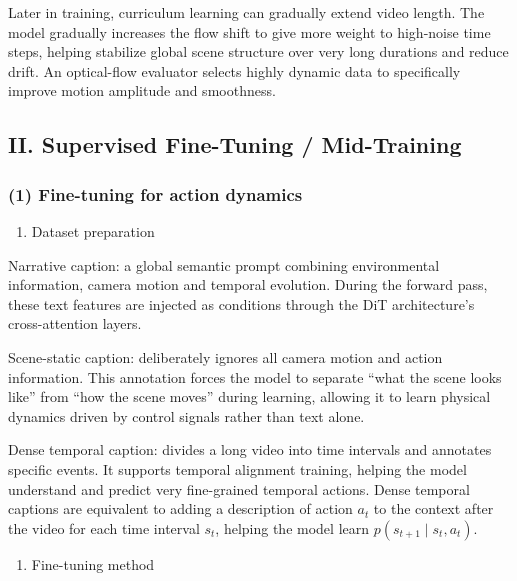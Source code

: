 Later in training, curriculum learning can gradually extend video length. The model gradually increases the flow shift to give more weight to high-noise time steps, helping stabilize global scene structure over very long durations and reduce drift. An optical-flow evaluator selects highly dynamic data to specifically improve motion amplitude and smoothness.

\hypertarget{ii.-supervised-fine-tuning-mid-training}{%
\subsection{II. Supervised Fine-Tuning / Mid-Training}\label{ii.-supervised-fine-tuning-mid-training}}

\hypertarget{fine-tuning-for-action-dynamics}{%
\subsubsection{(1) Fine-tuning for action dynamics}\label{fine-tuning-for-action-dynamics}}

\begin{enumerate}
\def\labelenumi{\arabic{enumi}.}
\tightlist
\item
  Dataset preparation
\end{enumerate}

Narrative caption: a global semantic prompt combining environmental information, camera motion and temporal evolution. During the forward pass, these text features are injected as conditions through the DiT architecture's cross-attention layers.

Scene-static caption: deliberately ignores all camera motion and action information. This annotation forces the model to separate ``what the scene looks like'' from ``how the scene moves'' during learning, allowing it to learn physical dynamics driven by control signals rather than text alone.

Dense temporal caption: divides a long video into time intervals and annotates specific events. It supports temporal alignment training, helping the model understand and predict very fine-grained temporal actions.
Dense temporal captions are equivalent to adding a description of action \(a_t\) to the context after the video for each time interval \(s_t\), helping the model learn \(p(s_{t+1}\mid s_t,a_t)\).

\begin{enumerate}
\def\labelenumi{\arabic{enumi}.}
\setcounter{enumi}{1}
\tightlist
\item
  Fine-tuning method
\end{enumerate}

